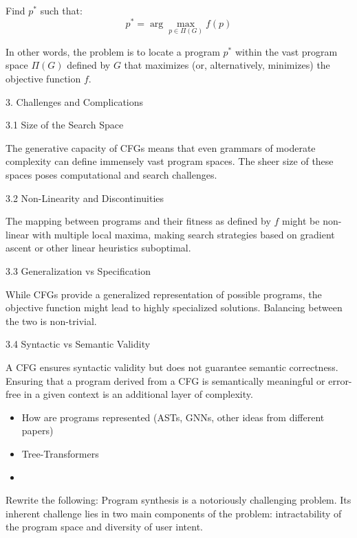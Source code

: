 Find \( p^* \) such that:
\[ p^* = \arg\max_{p \in \Pi(G)} f(p) \]

In other words, the problem is to locate a program \( p^* \) within the vast program space \( \Pi(G) \) defined by \( G \) that maximizes (or, alternatively, minimizes) the objective function \( f \).

3. Challenges and Complications

3.1 Size of the Search Space

The generative capacity of CFGs means that even grammars of moderate complexity can define immensely vast program spaces. The sheer size of these spaces poses computational and search challenges.

3.2 Non-Linearity and Discontinuities

The mapping between programs and their fitness as defined by \( f \) might be non-linear with multiple local maxima, making search strategies based on gradient ascent or other linear heuristics suboptimal.

3.3 Generalization vs Specification

While CFGs provide a generalized representation of possible programs, the objective function might lead to highly specialized solutions. Balancing between the two is non-trivial.

3.4 Syntactic vs Semantic Validity

A CFG ensures syntactic validity but does not guarantee semantic correctness. Ensuring that a program derived from a CFG is semantically meaningful or error-free in a given context is an additional layer of complexity.

\begin{itemize}
    \item How are programs represented (ASTs, GNNs, other ideas from different papers)
    \item Tree-Transformers
    \item 
\end{itemize}


Rewrite the following:
Program synthesis is a notoriously challenging problem. Its inherent challenge lies in two main components of the problem: intractability of the program space and diversity of user intent.

